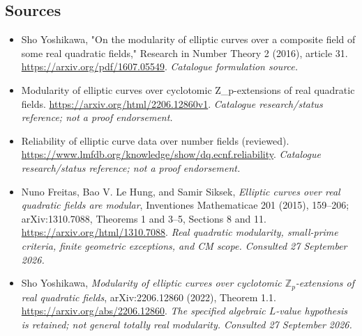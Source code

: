 \documentclass[11pt,a4paper]{article}
\newcommand{\Z}{\mathbb{Z}}
\numberwithin{equation}{section}
\begin{document}
\subsection{Sources}
\begin{itemize}\raggedright
\item[\textnormal{[S1]}]\hypertarget{source:statement:1}{} Sho Yoshikawa, "On the modularity of elliptic curves over a composite field of some real quadratic fields," Research in Number Theory 2 (2016), article 31.
\url{https://arxiv.org/pdf/1607.05549}.
{\small\textit{Catalogue formulation source.}}
\item[\textnormal{[S2]}]\hypertarget{source:statement:2}{} Modularity of elliptic curves over cyclotomic Z\_p-extensions of real quadratic fields.
\url{https://arxiv.org/html/2206.12860v1}.
{\small\textit{Catalogue research/status reference; not a proof endorsement.}}
\item[\textnormal{[S3]}]\hypertarget{source:statement:3}{} Reliability of elliptic curve data over number fields (reviewed).
\url{https://www.lmfdb.org/knowledge/show/dq.ecnf.reliability}.
{\small\textit{Catalogue research/status reference; not a proof endorsement.}}

\item[\textnormal{[E1]}]\hypertarget{extra:statement:1}{} Nuno Freitas, Bao V. Le Hung, and Samir Siksek, \emph{Elliptic curves over real quadratic fields are modular}, Inventiones Mathematicae 201 (2015), 159--206; arXiv:1310.7088, Theorems 1 and 3--5, Sections 8 and 11.
\url{https://arxiv.org/html/1310.7088}.
{\small\textit{Real quadratic modularity, small-prime criteria, finite geometric exceptions, and CM scope. Consulted 27 September 2026.}}
\item[\textnormal{[E2]}]\hypertarget{extra:statement:2}{} Sho Yoshikawa, \emph{Modularity of elliptic curves over cyclotomic $\Z_p$-extensions of real quadratic fields}, arXiv:2206.12860 (2022), Theorem 1.1.
\url{https://arxiv.org/abs/2206.12860}.
{\small\textit{The specified algebraic $L$-value hypothesis is retained; not general totally real modularity. Consulted 27 September 2026.}}
\end{itemize}
\end{document}
